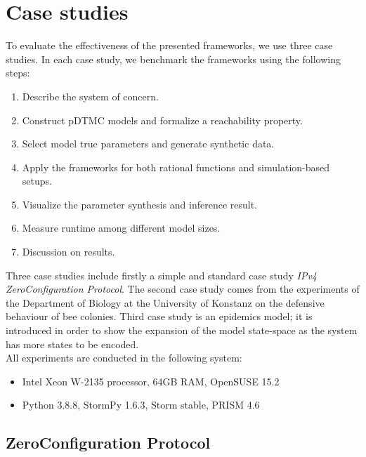 \chapter{Case studies}
To evaluate the effectiveness of the presented frameworks, we use three case studies. In each case
study, we benchmark the frameworks using the following steps:
\begin{enumerate}
    \item Describe the system of concern.
    \item Construct pDTMC models and formalize a reachability property.
    \item Select model true parameters and generate synthetic data.
    \item Apply the frameworks for both rational functions and simulation-based setups.
    \item Visualize the parameter synthesis and inference result.
    \item Measure runtime among different model sizes.
    \item Discussion on results.
\end{enumerate}
Three case studies include firstly a simple and standard case study \textit{IPv4 ZeroConfiguration
    Protocol}. The second case study comes from the experiments of the Department of Biology at the
University of Konstanz on the defensive behaviour of bee colonies\cite{hajnal2019data}. Third case
study is an epidemics model; it is introduced in order to show the expansion of the model
state-space as the system has more states to be encoded.\\
All experiments are conducted in the following system:
\begin{itemize}
    \item Intel Xeon W-2135 processor, 64GB RAM, OpenSUSE 15.2
    \item Python 3.8.8, StormPy 1.6.3, Storm stable, PRISM 4.6
\end{itemize}


\section{ZeroConfiguration Protocol}
